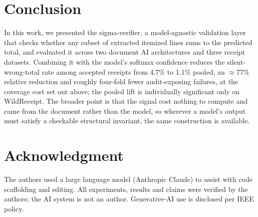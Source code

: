\documentclass[conference]{IEEEtran}
\begin{document}
\section{Conclusion}
\label{sec:conclusion}

In this work, we presented the sigma-verifier, a model-agnostic validation
layer that checks whether any subset of extracted itemized lines sums to the
predicted total, and evaluated it across two document AI architectures and
three receipt datasets. Combining it with the model's softmax confidence
reduces the silent-wrong-total rate among accepted receipts from 4.7\% to
1.1\% pooled, an $\approx$77\% relative reduction and roughly four-fold fewer
audit-exposing failures, at the coverage cost set out above; the pooled lift
is individually significant only on WildReceipt. The broader point is that the
signal cost nothing to compute and came from the document rather than the
model, so wherever a model's output must satisfy a checkable structural
invariant, the same construction is available.

\section*{Acknowledgment}
The authors used a large language model (Anthropic Claude) to assist with code
scaffolding and editing. All experiments, results and claims were verified by
the authors; the AI system is not an author. Generative-AI use is disclosed per
IEEE policy.



\end{document}
